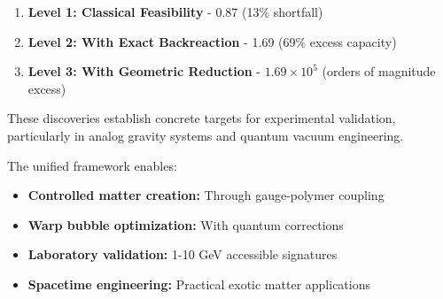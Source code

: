 \documentclass[11pt]{article}
\begin{document}
\begin{enumerate}
\item \textbf{Level 1: Classical Feasibility} - 0.87 (13\% shortfall)
\item \textbf{Level 2: With Exact Backreaction} - 1.69 (69\% excess capacity) 
\item \textbf{Level 3: With Geometric Reduction} - $1.69\times10^5$ (orders of magnitude excess)
\end{enumerate}

These discoveries establish concrete targets for experimental validation, particularly in analog gravity systems and quantum vacuum engineering.

The unified framework enables:
\begin{itemize}
  \item \textbf{Controlled matter creation:} Through gauge-polymer coupling
  \item \textbf{Warp bubble optimization:} With quantum corrections
  \item \textbf{Laboratory validation:} 1-10 GeV accessible signatures
  \item \textbf{Spacetime engineering:} Practical exotic matter applications
\end{itemize}
\end{document}
